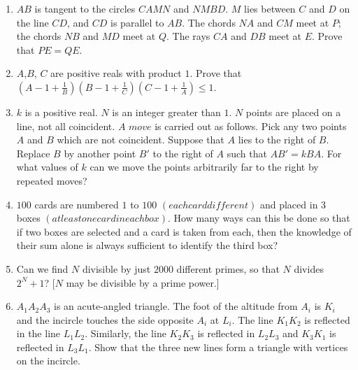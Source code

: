 \documentclass[12pt,-letter paper]{article}
\providecommand{\brak}[1]{\ensuremath{\left(#1\right)}}
\begin{document}
\begin{enumerate}
\item $AB$ is tangent to the circles $CAMN$ and $NMBD$. $M$ lies between $C$ and $D$ on the line $CD$, and $CD$ is parallel to $AB$. The chords $NA$ and $CM$ meet at $P$; the chords $NB$ and $MD$ meet at $Q$. The rays $CA$ and $DB$ meet at $E$. Prove that $PE = QE$.
\item  $A$,$ B$, $C$ are positive reals with product $1$. Prove that $\brak{A-1+\frac{1}{B}}\brak{B-1+\frac{1}{C}}\brak{C-1+\frac{1}{A}} \leq 1$.	
\item $k$ is a positive real. $N$ is an integer greater than $1$. $N$ points are placed on a line, not all coincident. $A$ $move$ is carried out as follows. Pick any two points $A$ and $B$ which are not coincident. Suppose that $A$ lies to the right of $B$. Replace $B$ by another point $B'$ to the right of $A$ such that $AB' = kBA$. For what values of $k$ can we move the points arbitrarily far to the right by repeated moves?	
\item $100$ cards are numbered $1$ to $100$ $\brak{each card different}$ and placed in $3$ boxes $\brak{at least one card in each box}$. How many ways can this be done so that if two boxes are selected and a card is taken from each, then the knowledge of their sum alone is always sufficient to identify the third box?	
\item Can we find $N$ divisible by just $2000$ different primes, so that $N$ divides $2^N + 1$? [$N$ may be divisible by a prime power.]
\item ${A_{1}} {A_{2}} {A_{3}}$ is an acute-angled triangle. The foot of the altitude from ${A_{i}}$ is ${K_{i}}$ and the incircle touches the side opposite ${A_{i}}$ at ${L_{i}}$. The line ${K_{1}}{K_{2}}$ is reflected in the line ${L_{1}}{L_{2}}$. Similarly, the line ${K_{2}}{K_{3}}$ is reflected in ${L_{2}}{L_{3}}$ and ${K_{3}}{K_{1}}$ is reflected in ${L_{3}}{L_{1}}$. Show that the three new lines form a triangle with vertices on the incircle.	
\end{enumerate}
\end{document}
